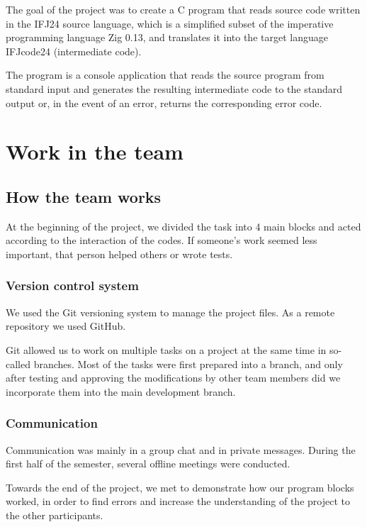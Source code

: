 \documentclass[a4paper, 11pt]{article}
\begin{document}
	The goal of the project was to create a C program that reads source code written in the IFJ24 source language,
    which is a simplified subset of the imperative programming language Zig 0.13, and translates it into the target language IFJcode24 (intermediate code).
    
    The program is a console application that reads the source program from standard input and generates
    the resulting intermediate code to the standard output or, in the event of an error, returns the corresponding error code.



	\section{Work in the team}

	\subsection{How the team works}

    At the beginning of the project, we divided the task into 4 main blocks and acted according to the interaction of the codes. If someone's work seemed less important, that person helped others or wrote tests.
	\subsubsection{Version control system}

	We used the Git versioning system to manage the project files. As a remote repository we used \mbox{GitHub}.

	Git allowed us to work on multiple tasks on a project at the same time in so-called branches. Most of the tasks were first prepared
	into a branch, and only after testing and approving the modifications by other team members did we incorporate them into the main
	development branch.

	\subsubsection{Communication}

	Communication was mainly in a group chat and in private messages. During the first half of the semester, several offline meetings were conducted.

	Towards the end of the project, we met to demonstrate how our program blocks worked, in order to find errors and increase the understanding of the project to the other participants.
\end{document}
